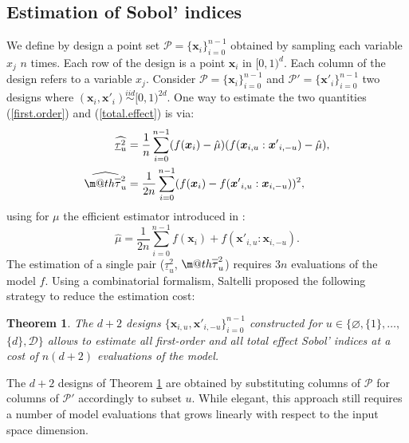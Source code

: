 \documentclass[]{elsarticle}
\makeatletter
\newtheorem{theorem}{Theorem}
\theoremstyle{definition}
\newcommand{\bvec}[1]{\boldsymbol{#1}}
\newcommand{\vx}{\bvec{x}}
\newcommand\iid{\stackrel{iid}{\sim}}
\newcommand*{\ov}[1]{
  \m@th\overline{\mbox{#1}\raisebox{2mm}{}}
}
\makeatother
\begin{document}
\subsection{Estimation of Sobol' indices}

We define by design a point set $\mathcal{P}=\{\vx_i\}_{i=0}^{n-1}$ obtained by sampling each variable $x_j$ $n$ times. Each row of the design is a point $\vx_i$ in $[0,1)^d$. Each column of the design refers to a variable $x_j$. Consider $\mathcal{P}=\{\vx_i\}_{i=0}^{n-1}$ and $\mathcal{P'}=\{{\vx'}_i\}_{i=0}^{n-1}$ two designs where $(\vx_i,{\vx'}_i) \iid [0,1)^{2d}$. One way to estimate the two quantities (\ref{first.order}) and (\ref{total.effect}) is via:
\begin{align}
\label{first.order.est}
\widehat{\underline{\tau}_u^2} & = \frac{1}{n} \sum \limits_{i=0}^{n-1} (f(\vx_i)-\hat{\mu})(f(\vx_{i,u}:{\vx'}_{i,-u})-\hat{\mu}),\\
\label{total.effect.est}
\widehat{\ov{$\tau$}_u^2} & = \frac{1}{2n} \sum \limits_{i=0}^{n-1} (f(\vx_i) - f({\vx'}_{i,u}:\vx_{i,-u}))^2,
\end{align}
using for $\mu$ the efficient estimator introduced in \cite{Monod, Janon}:
\[ \hat{\mu} = \frac{1}{2n} \sum \limits_{i=0}^{n-1} f(\vx_i) + f({\vx'}_{i,u}:\vx_{i,-u}). \]
The estimation of a single pair ($\underline{\tau}_u^2$, $\ov{$\tau$}_u^2$) requires $3n$ evaluations of the model $f$. Using a combinatorial formalism, Saltelli \cite[Theorem 1]{Saltelli} proposed the following strategy to reduce the estimation cost:
\begin{theorem}
\label{saltelli.theorem}
The $d+2$ designs $\{\vx_{i,u},{\vx'}_{i,-u}\}_{i=0}^{n-1}$ constructed for $u \in \{\varnothing,\{1\},\dots,$ $\{d\},\mathcal{D}\}$ allows to estimate all first-order and all total effect Sobol' indices at a cost of $n(d+2)$ evaluations of the model.
\end{theorem}
The $d+2$ designs of Theorem \ref{saltelli.theorem} are obtained by substituting columns of $\mathcal{P}$ for columns of $\mathcal{P}'$ accordingly to subset $u$. While elegant, this approach still requires a number of model evaluations that grows linearly with respect to the input space dimension.
\end{document}
